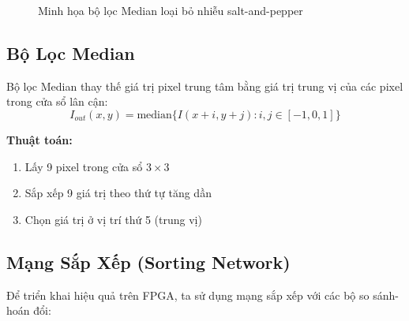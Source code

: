 \documentclass[12pt,a4paper]{report}
\begin{document}
\begin{figure}[H]
\centering
{}
\caption{Minh họa bộ lọc Median loại bỏ nhiễu salt-and-pepper}
\label{fig:median_demo}
\end{figure}

\subsection{Bộ Lọc Median}
Bộ lọc Median thay thế giá trị pixel trung tâm bằng giá trị trung vị của các pixel trong cửa sổ lân cận:
\begin{equation}
    I_{out}(x,y) = \text{median}\{I(x+i, y+j) : i,j \in [-1,0,1]\}
\end{equation}

\textbf{Thuật toán:}
\begin{enumerate}
    \item Lấy 9 pixel trong cửa sổ $3\times3$
    \item Sắp xếp 9 giá trị theo thứ tự tăng dần
    \item Chọn giá trị ở vị trí thứ 5 (trung vị)
\end{enumerate}

\subsection{Mạng Sắp Xếp (Sorting Network)}
Để triển khai hiệu quả trên FPGA, ta sử dụng mạng sắp xếp với các bộ so sánh-hoán đổi:
\end{document}

